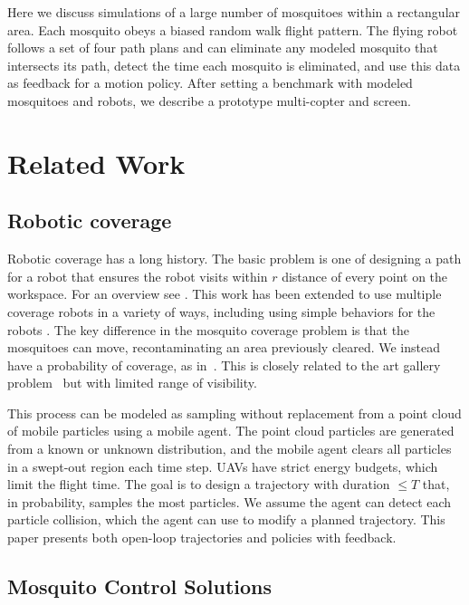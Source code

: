 \documentclass[letterpaper, 10 pt, conference]{ieeeconf}  %
\begin{document}
Here we discuss simulations of a large number of mosquitoes within a rectangular area. Each mosquito obeys a biased random walk flight pattern. The flying robot follows a set of four path plans and can eliminate any modeled mosquito that intersects its path, detect the time each mosquito is eliminated, and use this data as feedback for a motion policy.  After setting a benchmark with modeled mosquitoes and robots, we describe a prototype multi-copter and screen.


  \section{Related Work}\label{sec:coverage}
  
      \subsection{Robotic coverage}
    Robotic coverage has a long history. The basic problem is one of designing a path for a robot that ensures the robot visits within $r$ distance of every point on the workspace.  For an overview see \cite{Choset2001}.  This work has been extended to use multiple coverage robots in a variety of ways, including using simple behaviors for the robots \cite{spears2006physics,Koenig2001}.
    The key difference in the mosquito coverage problem is that the mosquitoes can move, recontaminating an area previously cleared. We instead have a probability of coverage, as in~\cite{Das2011}.  This is closely related to the art gallery problem~\cite{lee1986computational} but with limited range of visibility.
    
    This process can be modeled as sampling without replacement from a point cloud of mobile particles using a mobile agent.  The point cloud particles are generated from a known or unknown distribution, and the mobile agent clears all particles in a swept-out region each time step. 
    UAVs have strict energy budgets, which limit the flight time.
    The goal is to design a trajectory with duration $\le T$ that, in probability, samples the most particles.  
   We assume the agent can detect each particle collision, which the agent can use to modify a planned trajectory.
    This paper presents both open-loop trajectories and policies with feedback. 
  
  
  \subsection{Mosquito Control Solutions}
  
\end{document}

